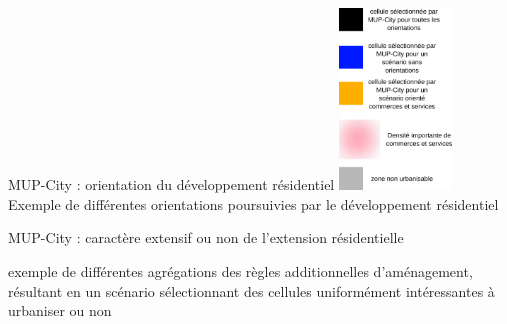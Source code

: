 \documentclass[xcolor=table]{beamer}
\begin{document}

\begin{frame}{MUP-City : orientation du développement résidentiel}
\vspace{1cm}
\hspace*{-0.5cm}
\includegraphics[width=3cm]{Images/legendAHP.png}
\\
{\footnotesize Exemple de différentes orientations poursuivies par le développement résidentiel}
\end{frame}


\begin{frame}{MUP-City : caractère extensif ou non de l'extension résidentielle}
\vspace{1cm}
\hspace*{-0.5cm}

{\footnotesize exemple de différentes agrégations des règles additionnelles d'aménagement, résultant en un scénario sélectionnant des cellules uniformément intéressantes à urbaniser ou non}
\end{frame}
\end{document}

